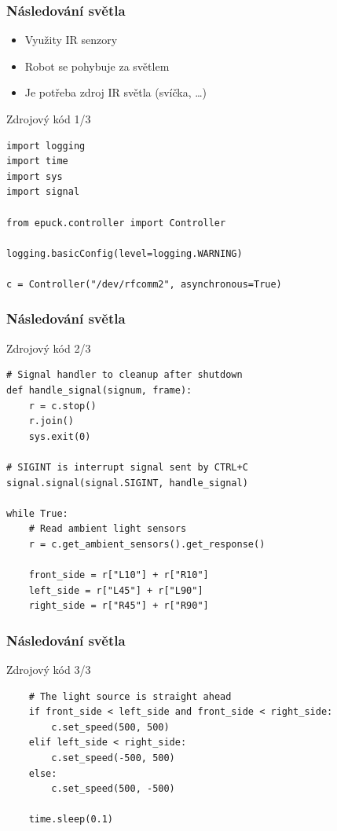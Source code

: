\documentclass{beamer}
\begin{document}
\begin{frame}[fragile]
    \frametitle{Následování světla}
    \begin{itemize}
        \item Využity IR senzory
        \item Robot se pohybuje za světlem
        \item Je potřeba zdroj IR světla (svíčka, \ldots)
    \end{itemize}
    \begin{exampleblock}{Zdrojový kód 1/3}
    \begin{verbatim}
import logging
import time
import sys
import signal

from epuck.controller import Controller

logging.basicConfig(level=logging.WARNING)

c = Controller("/dev/rfcomm2", asynchronous=True)
    \end{verbatim}
    \end{exampleblock}
\end{frame}

\begin{frame}[fragile,t]
    \frametitle{Následování světla}
    \begin{exampleblock}{Zdrojový kód 2/3}
    \begin{verbatim}
# Signal handler to cleanup after shutdown
def handle_signal(signum, frame):
    r = c.stop()
    r.join()
    sys.exit(0)

# SIGINT is interrupt signal sent by CTRL+C
signal.signal(signal.SIGINT, handle_signal)

while True:
    # Read ambient light sensors
    r = c.get_ambient_sensors().get_response()

    front_side = r["L10"] + r["R10"]
    left_side = r["L45"] + r["L90"]
    right_side = r["R45"] + r["R90"]
    \end{verbatim}
    \end{exampleblock}
\end{frame}

\begin{frame}[fragile,t]
    \frametitle{Následování světla}
    \begin{exampleblock}{Zdrojový kód 3/3}
    \begin{verbatim}
    # The light source is straight ahead
    if front_side < left_side and front_side < right_side:
        c.set_speed(500, 500)
    elif left_side < right_side:
        c.set_speed(-500, 500)
    else:
        c.set_speed(500, -500)

    time.sleep(0.1)

    \end{verbatim}
    \end{exampleblock}
\end{frame}
\end{document}
